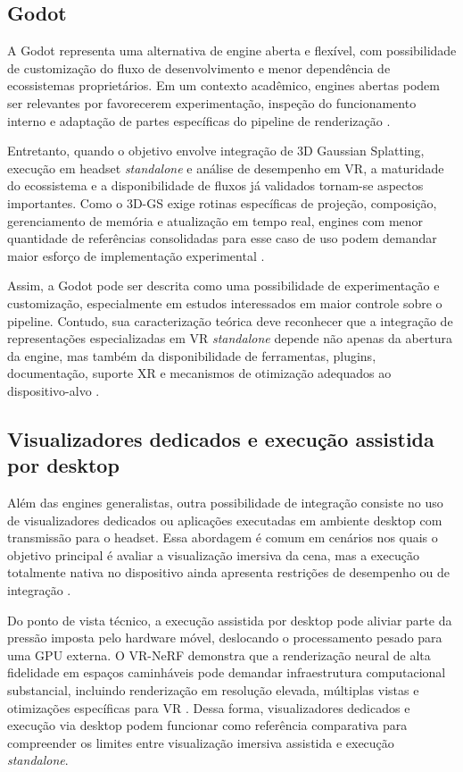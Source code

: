 \subsection{Godot}

A Godot representa uma alternativa de engine aberta e flexível, com possibilidade de customização do fluxo de desenvolvimento e menor dependência de ecossistemas proprietários. Em um contexto acadêmico, engines abertas podem ser relevantes por favorecerem experimentação, inspeção do funcionamento interno e adaptação de partes específicas do pipeline de renderização \cite{tu2025,kerbl2023,fei2025survey3dgs}.

Entretanto, quando o objetivo envolve integração de 3D Gaussian Splatting, execução em headset \textit{standalone} e análise de desempenho em VR, a maturidade do ecossistema e a disponibilidade de fluxos já validados tornam-se aspectos importantes. Como o 3D-GS exige rotinas específicas de projeção, composição, gerenciamento de memória e atualização em tempo real, engines com menor quantidade de referências consolidadas para esse caso de uso podem demandar maior esforço de implementação experimental \cite{kerbl2023,fei2025survey3dgs,chen2024survey3dgs,metaquest3s2024}.

Assim, a Godot pode ser descrita como uma possibilidade de experimentação e customização, especialmente em estudos interessados em maior controle sobre o pipeline. Contudo, sua caracterização teórica deve reconhecer que a integração de representações especializadas em VR \textit{standalone} depende não apenas da abertura da engine, mas também da disponibilidade de ferramentas, plugins, documentação, suporte XR e mecanismos de otimização adequados ao dispositivo-alvo \cite{xu2023,tu2025,metaquest3s2024}.

\subsection{Visualizadores dedicados e execução assistida por desktop}

Além das engines generalistas, outra possibilidade de integração consiste no uso de visualizadores dedicados ou aplicações executadas em ambiente desktop com transmissão para o headset. Essa abordagem é comum em cenários nos quais o objetivo principal é avaliar a visualização imersiva da cena, mas a execução totalmente nativa no dispositivo ainda apresenta restrições de desempenho ou de integração \cite{xu2023,metaquest3s2024}.

Do ponto de vista técnico, a execução assistida por desktop pode aliviar parte da pressão imposta pelo hardware móvel, deslocando o processamento pesado para uma GPU externa. O VR-NeRF demonstra que a renderização neural de alta fidelidade em espaços caminháveis pode demandar infraestrutura computacional substancial, incluindo renderização em resolução elevada, múltiplas vistas e otimizações específicas para VR \cite{xu2023}. Dessa forma, visualizadores dedicados e execução via desktop podem funcionar como referência comparativa para compreender os limites entre visualização imersiva assistida e execução \textit{standalone}.

